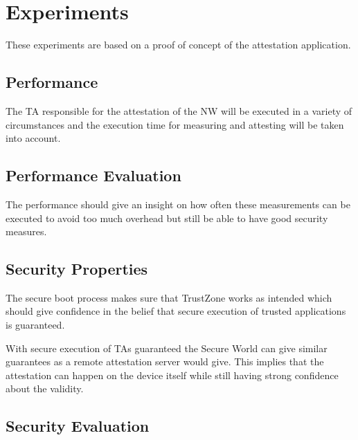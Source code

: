 \documentclass{report}
\begin{document}
\chapter{Experiments}

These experiments are based on a proof of concept of the attestation application.

\section{Performance}

The TA responsible for the attestation of the NW will be executed in a variety of circumstances and the execution time for measuring and attesting will be taken into account. 

\section{Performance Evaluation}

The performance should give an insight on how often these measurements can be executed to avoid too much overhead but still be able to have good security measures.

\section{Security Properties}

The secure boot process makes sure that TrustZone works as intended which should give confidence in the belief that secure execution of trusted applications is guaranteed.
\medskip

With secure execution of TAs guaranteed the Secure World can give similar guarantees as a remote attestation server would give. This implies that the attestation can happen on the device itself while still having strong confidence about the validity.

\section{Security Evaluation}
\end{document}
